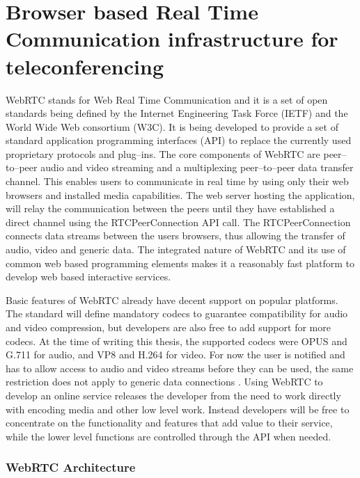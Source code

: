 \documentclass[english,12pt,a4paper,dvips]{article}
\begin{document}
\section{Browser based Real Time Communication infrastructure for teleconferencing}

WebRTC stands for Web Real Time Communication and it is a set of open standards being defined by the Internet Engineering Task Force (IETF) and the World Wide Web consortium (W3C). It is being developed to provide a set of standard application programming interfaces (API) to replace the currently used proprietary protocols and plug--ins. The core components of WebRTC are peer--to--peer audio and video streaming and a multiplexing peer--to--peer data transfer channel. This enables users to communicate in real time by using only their web browsers and installed media capabilities. The web server hosting the application, will relay the communication between the peers until they have established a direct channel using the RTCPeerConnection API call. The RTCPeerConnection connects data streams between the users browsers, thus allowing the transfer of audio, video and generic data. \cite{Jennings} The integrated nature of WebRTC and its use of common web based programming elements makes it a reasonably fast platform to develop web based interactive services.

Basic features of WebRTC already have decent support on popular platforms. The standard will define mandatory codecs to guarantee compatibility for audio and video compression, but developers are also free to add support for more codecs. At the time of writing this thesis, the supported codecs were OPUS and G.711 for audio, and VP8 and H.264 for video. \cite{Jennings} For now the user is notified and has to allow access to audio and video streams before they can be used, the same restriction does not apply to generic data connections \cite{Johnston}. Using WebRTC to develop an online service releases the developer from the need to work directly with encoding media and other low level work. Instead developers will be free to concentrate on the functionality and features that add value to their service, while the lower level functions are controlled through the API when needed.

\subsubsection{WebRTC Architecture}
\end{document}
